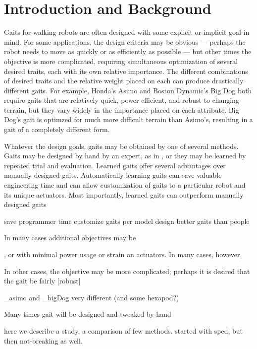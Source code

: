\section{Introduction and Background}



Gaits for walking robots are often designed with some explicit or
implicit goal in mind.  For some applications, the design criteria may
be obvious --- perhaps the robot needs to move as quickly or as
efficiently as possible --- but other times the objective is more complicated,
requiring simultaneous optimization of several desired traits, each
with its own relative importance.  The different combinations of desired traits and the relative weight placed on each can produce drastically different gaits.    For example, Honda's Asimo
\cite{_asmio} and Boston Dynamic's Big Dog \cite{_bigdog} both require
gaits that are relatively quick, power efficient, and robust to
changing terrain, but they vary widely in the importance placed
on each attribute.  Big Dog's gait is optimzed for much more difficult terrain than Asimo's, resulting in a gait of a completely different form.

Whatever the design goals, gaits may be obtained by one of several methods.  Gaits may be designed by hand by an expert, as in \cite{_asmio, _bigdog}, or they may be learned by repeated trial and evaluation.  Learned gaits offer several advantages over manually designed gaits.  Automatically learning gaits can save valuable engineering time and can allow customization of gaits to a particular robot and its unique actuators.  Most importantly, learned gaits can outperform manually designed gaits

save programmer time
customize gaits per model
design better gaits than people



In many cases additional objectives may be 

, or with minimal power usage or strain on
actuators.  In many cases, however, 




In other cases, the objective may be more complicated; perhaps it is desired that the gait be fairly [robust]

\_asimo and \_bigDog very different (and some hexapod?)

Many times gait will be designed and tweaked by hand \cite{_asimo}

here we describe a study, a comparison of few methods. started with
sped, but then not-breaking as well.


